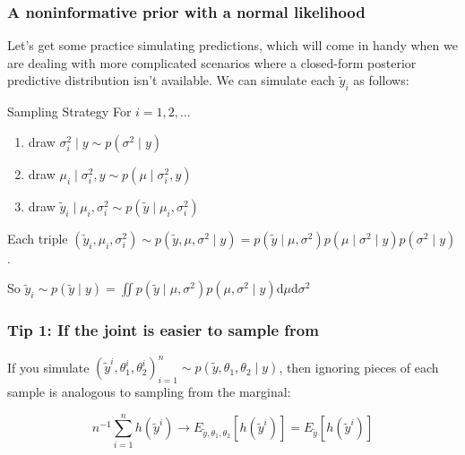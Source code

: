 \documentclass{beamer}
\begin{document}
\begin{frame}
\frametitle{A noninformative prior with a normal likelihood}

Let's get some practice simulating predictions, which will come in handy when we are dealing with more complicated scenarios where a closed-form posterior predictive distribution isn't available. We can simulate each $\tilde{y}_i$  as follows:

\begin{block}{Sampling Strategy}
For $i=1,2,\ldots$
\begin{enumerate}
\item draw $\sigma^2_i \mid y \sim p(\sigma^2 \mid y)$
\item draw $\mu_i \mid \sigma^2_i, y \sim p(\mu \mid \sigma^2_i, y)$
\item draw $\tilde{y}_i \mid \mu_i, \sigma^2_i \sim p(\tilde{y} \mid \mu_i, \sigma^2_i)$
\end{enumerate}
\end{block}

Each triple $(\tilde{y}_i, \mu_i, \sigma^2_i) \sim p(\tilde{y}, \mu, \sigma^2 \mid y) = p(\tilde{y} \mid \mu, \sigma^2) p(\mu \mid \sigma^2 \mid y)p(\sigma^2 \mid y)$.
\newline

So $ \tilde{y}_i \sim p(\tilde{y} \mid y) = \iint p(\tilde{y} \mid \mu, \sigma^2) p(\mu, \sigma^2 \mid y) \text{d} \mu \text{d} \sigma^2$



\end{frame}

\begin{frame}
\frametitle{Tip 1: If the joint is easier to sample from}

If you simulate $(\tilde{y}^i, \theta_1^i, \theta_2^i)_{i=1}^n \sim p(\tilde{y}, \theta_1, \theta_2 \mid y)$, then ignoring pieces of each sample is analogous to sampling from the marginal:

\[
n^{-1}\sum_{i=1}^n h(\tilde{y}^i) \to E_{\tilde{y}, \theta_1, \theta_2}[h(\tilde{y}^i)] = E_{\tilde{y}}[h(\tilde{y}^i)]
\]
\end{frame}
\end{document}
